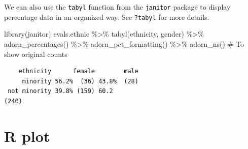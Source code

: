 \documentclass[
  letterpaper,
  DIV=11,
  numbers=noendperiod]{scrartcl}
\newenvironment{Shaded}{\begin{snugshade}}{\end{snugshade}}
\newcommand{\CommentTok}[1]{\textcolor[rgb]{0.37,0.37,0.37}{#1}}
\newcommand{\FunctionTok}[1]{\textcolor[rgb]{0.28,0.35,0.67}{#1}}
\newcommand{\NormalTok}[1]{\textcolor[rgb]{0.00,0.23,0.31}{#1}}
\newcommand{\SpecialCharTok}[1]{\textcolor[rgb]{0.37,0.37,0.37}{#1}}
\begin{document}
\begin{tcolorbox}[enhanced jigsaw, colframe=quarto-callout-tip-color-frame, toprule=.15mm, toptitle=1mm, opacitybacktitle=0.6, breakable, colback=white, opacityback=0, title=\textcolor{quarto-callout-tip-color}{\faLightbulb}\hspace{0.5em}{Tip}, rightrule=.15mm, bottomrule=.15mm, coltitle=black, colbacktitle=quarto-callout-tip-color!10!white, leftrule=.75mm, left=2mm, arc=.35mm, bottomtitle=1mm, titlerule=0mm]

We can also use the \texttt{tabyl} function from the \texttt{janitor}
package to display percentage data in an organized way. See
\texttt{?tabyl} for more details.

\begin{Shaded}
\begin{Highlighting}[]
\FunctionTok{library}\NormalTok{(janitor)}
\NormalTok{evals.ethnic }\SpecialCharTok{\%\textgreater{}\%}
  \FunctionTok{tabyl}\NormalTok{(ethnicity, gender) }\SpecialCharTok{\%\textgreater{}\%}
  \FunctionTok{adorn\_percentages}\NormalTok{() }\SpecialCharTok{\%\textgreater{}\%}
  \FunctionTok{adorn\_pct\_formatting}\NormalTok{() }\SpecialCharTok{\%\textgreater{}\%}
  \FunctionTok{adorn\_ns}\NormalTok{() }\CommentTok{\# To show original counts}
\end{Highlighting}
\end{Shaded}

\begin{verbatim}
    ethnicity      female        male
     minority 56.2%  (36) 43.8%  (28)
 not minority 39.8% (159) 60.2                                        (240)
\end{verbatim}

\end{tcolorbox}

\section{R plot}
\end{document}
